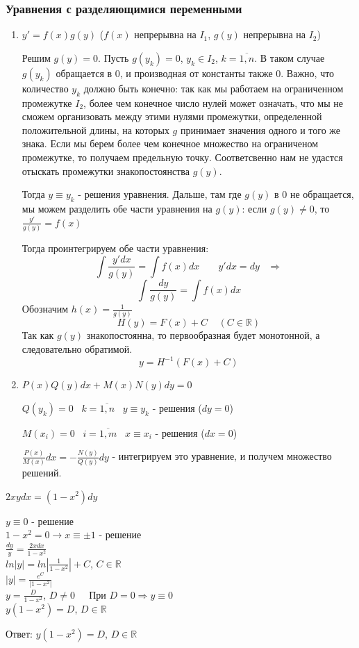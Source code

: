 \subsubsection{Уравнения с разделяющимися переменными}
\begin{enumerate}
    \item $y'=f(x)g(y)$ ($f(x)$ непрерывна на $I_1$, $g(y)$ непрерывна на $I_2$)
    \begin{nonum}
    Решим $g(y)=0$. Пусть $g(y_k)=0$, $y_k \in I_2$, $k=\overline{1,n}$. В таком случае $g(y_k)$ обращается в 0, и производная от константы также 0. Важно, что количество $y_k$ должно быть конечно: так как мы работаем на ограниченном промежутке $I_2$, более чем конечное число нулей может означать, что мы не сможем организовать между этими нулями промежутки, определенной положительной длины, на которых $g$ принимает значения одного и того же знака. Если мы берем более чем конечное множество на ограниченом промежутке, то получаем предельную точку. Соответсвенно нам не удастся отыскать промежутки знакопостоянства $g(y)$.
    
    Тогда $y\equiv y_k$ - решения уравнения.
    Дальше, там где $g(y)$ в 0 не обращается, мы можем разделить обе части уравнения на $g(y)$:
    если $g(y)\neq 0$, то $\frac{y'}{g(y)}=f(x)$
    
    Тогда проинтегрируем обе части уравнения:
    $$\int\frac{y'dx}{g(y)} = \int f(x)dx \;\;\;\;\;\;\; y'dx=dy \;\;\; \Rightarrow$$
    $$\int \frac{dy}{g(y)} = \int f(x)dx$$ Обозначим $h(x)=\frac{1}{g(y)}$
    $$H(y)=F(x)+C \;\;\;\; (C\in \mathbb{R})$$
    Так как $g(y)$ знакопостоянна, то первообразная будет монотонной, а следовательно обратимой.
    $$y=H^{-1}(F(x)+C)$$
    \end{nonum}
    \item $P(x)Q(y)dx+M(x)N(y)dy=0$
    \begin{nonum}
    $Q(y_k)=0 \;\;\; k=\overline{1, n} \;\;\; y\equiv y_k$ - решения ($dy=0$)
    
    $M(x_i)=0 \;\;\; i=\overline{1, m} \;\;\; x\equiv x_i$ - решения ($dx=0$)
    
    $\frac{P(x)}{M(x)}dx=-\frac{N(y)}{Q(y)}dy$
     - интегрируем это уравнение, и получем множество решений.
    \end{nonum}
\end{enumerate}
\begin{example}
$2xydx=(1-x^2)dy$
\begin{nonum}
\hangindent=1cm  \noindent
$y\equiv0$ - решение\\
$1-x^2=0 \rightarrow x \equiv \pm 1$ - решение\\
$\frac{dy}{y}=\frac{2xdx}{1-x^2}$\\
$ln\left|y\right|=ln\left|\frac{1}{1-x^2}\right|+C$, $C \in \mathbb{R}$\\
$|y|=\frac{e^C}{\left|1-x^2\right|}$\\
$y=\frac{D}{1-x^2}$, $D\neq0 \;\;\;\;$ При $D=0 \Rightarrow y\equiv0$\\
$y(1-x^2)=D$, $D\in \mathbb{R}$

Ответ: $y(1-x^2)=D$, $D \in \mathbb{R}$
\end{nonum}
\end{example}